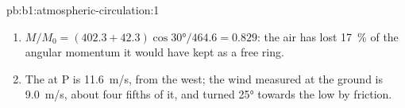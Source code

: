 \begin{solution}{pb:b1:atmospheric-circulation:1}
\begin{enumerate}
        than at rest on the equator. The zonal mean also averages a meandering jet
        over all .
  \item $M/M_0 = (402.3 + 42.3)\cos\ang{30}/464.6 = 0.829$: the air has lost
        \qty{17}{\percent} of the angular momentum it would have kept as a free
        ring.
  \item The  at P is \qty{11.6}{m/s}, from the west; the wind
        measured at the ground is \qty{9.0}{m/s}, about four fifths of it, and turned
        \ang{25} towards the low by friction.
\end{enumerate}
\end{solution}
